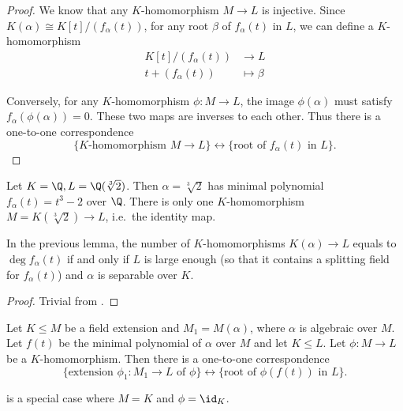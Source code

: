 \documentclass[a4paper]{article}
\begin{document}
\begin{proof}
  We know that any \(K\)-homomorphism \(M \to L\) is injective. Since \(K(\alpha) \cong K[t]/(f_\alpha(t))\), for any root \(\beta\) of \(f_\alpha(t)\) in \(L\), we can define a \(K\)-homomorphism
  \begin{align*}
    K[t]/(f_\alpha(t)) &\to L \\
    t + (f_\alpha(t)) &\mapsto \beta
  \end{align*}

  Conversely, for any \(K\)-homomorphism \(\phi: M \to L\), the image \(\phi(\alpha)\) must satisfy \(f_\alpha(\phi(\alpha)) = 0\). These two maps are inverses to each other. Thus there is a one-to-one correspondence
  \[
    \{K\text{-homomorphism } M \to L\} \leftrightarrow \{\text{root of } f_\alpha(t) \text{ in } L\}.
  \]
\end{proof}

\begin{eg}
  Let \(K = \Q, L = \Q(\sqrt[3]{2})\). Then \(\alpha = \sqrt[3]{2}\) has minimal polynomial \(f_\alpha(t) = t^3 - 2\) over \(\Q\). There is only one \(K\)-homomorphism \(M = K(\sqrt[3]{2}) \to L\), i.e.\ the identity map.
\end{eg}

\begin{corollary}
  In the previous lemma, the number of \(K\)-homomorphisms \(K(\alpha) \to L\) equals to \(\deg f_\alpha(t)\) if and only if \(L\) is large enough (so that it contains a splitting field for \(f_\alpha(t)\)) and \(\alpha\) is separable over \(K\).
\end{corollary}

\begin{proof}
  Trivial from .
\end{proof}

\begin{lemma}
  \label{lem:homomorphic extension of algebraic extension}
  Let \(K \leq M\) be a field extension and \(M_1 = M(\alpha)\), where \(\alpha\) is algebraic over \(M\). Let \(f(t)\) be the minimal polynomial of \(\alpha\) over \(M\) and let \(K \leq L\). Let \(\phi: M \to L\) be a \(K\)-homomorphism. Then there is a one-to-one correspondence
  \[
    \{\text{extension } \phi_1: M_1 \to L \text{ of } \phi\} \leftrightarrow \{\text{root of } \phi(f(t)) \text{ in } L\}.
  \]
\end{lemma}

\begin{remark}
   is a special case where \(M = K\) and \(\phi = \id_K\).
\end{remark}
\end{document}
